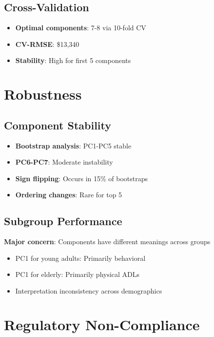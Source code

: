 \subsection{Cross-Validation}

\begin{itemize}
    \item \textbf{Optimal components}: 7-8 via 10-fold CV
    \item \textbf{CV-RMSE}: \$13,340
    \item \textbf{Stability}: High for first 5 components
\end{itemize}

\section{Robustness}

\subsection{Component Stability}

\begin{itemize}
    \item \textbf{Bootstrap analysis}: PC1-PC5 stable
    \item \textbf{PC6-PC7}: Moderate instability
    \item \textbf{Sign flipping}: Occurs in 15\% of bootstraps
    \item \textbf{Ordering changes}: Rare for top 5
\end{itemize}

\subsection{Subgroup Performance}

\textbf{Major concern}: Components have different meanings across groups
\begin{itemize}
    \item PC1 for young adults: Primarily behavioral
    \item PC1 for elderly: Primarily physical ADLs
    \item Interpretation inconsistency across demographics
\end{itemize}

\section{Regulatory Non-Compliance}

